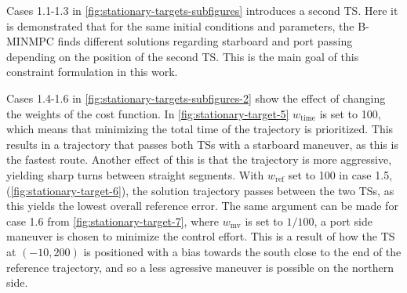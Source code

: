 
Cases 1.1-1.3 in \cref{fig:stationary-targets-subfigures} introduces a second TS. Here it is demonstrated that for the same initial conditions and parameters, the B-MINMPC finds different solutions regarding starboard and port passing depending on the position of the second TS. This is the main goal of this constraint formulation in this work. 

Cases 1.4-1.6 in \cref{fig:stationary-targets-subfigures-2} show the effect of changing the weights of the cost function. In \cref{fig:stationary-target-5} $w_\text{time}$ is set to 100, which means that minimizing the total time of the trajectory is prioritized. This results in a trajectory that passes both TSs with a starboard maneuver, as this is the fastest route. Another effect of this is that the trajectory is more aggressive, yielding sharp turns between straight segments. With $w_\text{ref}$ set to 100 in case 1.5, (\cref{fig:stationary-target-6}), the solution trajectory passes between the two TSs, as this yields the lowest overall reference error. The same argument can be made for case 1.6 from \cref{fig:stationary-target-7}, where $w_\text{mv}$ is set to $1/100$, a port side maneuver is chosen to minimize the control effort. This is a result of how the TS at $(-10, 200)$ is positioned with a bias towards the south close to the end of the reference trajectory, and so a less agressive maneuver is possible on the northern side. 

